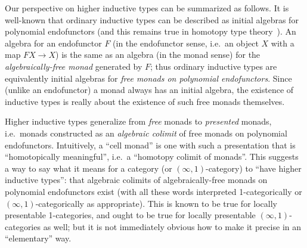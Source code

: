 \documentclass{amsart}
\begin{document}
Our perspective on higher inductive types can be summarized as follows.
It is well-known that ordinary inductive types can be described as initial algebras for polynomial endofunctors (and this remains true in homotopy type theory~\cite{ags:it-hott}).
An algebra for an endofunctor $F$ (in the endofunctor sense, i.e.\ an object $X$ with a map $F X \to X$) is the same as an algebra (in the monad sense) for the \emph{algebraically-free monad} generated by $F$; thus ordinary inductive types are equivalently initial algebras for \emph{free monads on polynomial endofunctors}.
Since (unlike an endofunctor) a monad always has an initial algebra, the existence of inductive types is really about the existence of such free monads themselves.

Higher inductive types generalize from \emph{free} monads to \emph{presented} monads, i.e.\ monads constructed as an \emph{algebraic colimit} of free monads on polynomial endofunctors.
Intuitively, a ``cell monad'' is one with such a presentation that is ``homotopically meaningful'', i.e.\ a ``homotopy colimit of monads''.
This suggests a way to say what it means for a category (or $(\infty,1)$-category) to ``have higher inductive types'': that algebraic colimits of algebraically-free monads on polynomial endofunctors exist (with all these words interpreted 1-categorically or $(\infty,1)$-categorically as appropriate).
This is known to be true for locally presentable 1-categories, and ought to be true for locally presentable $(\infty,1)$-categories as well; but it is not immediately obvious how to make it precise in an ``elementary'' way.
\end{document}
